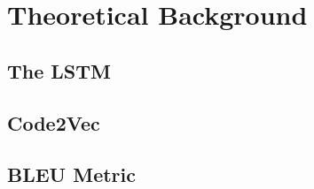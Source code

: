 \chapter{Theoretical Background}
\label{theoreticalbackground}

\section{The LSTM} %
\label{sec:lstm}

\blindtext

\section{Code2Vec} %
\label{sec:lstm}
\blindtext


\section{BLEU Metric} %
\label{sec:lstm}
\blindtext